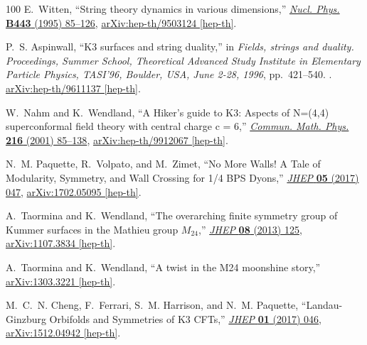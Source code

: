 \begin{thebibliography}{100}
E.~Witten, ``{String theory dynamics in various dimensions},''
  \href{http://dx.doi.org/10.1016/0550-3213(95)00158-O}{{\em Nucl. Phys.}
  {\bfseries B443} (1995) 85--126},
\href{http://arxiv.org/abs/hep-th/9503124}{{\ttfamily arXiv:hep-th/9503124
  [hep-th]}}.

P.~S. Aspinwall, ``{K3 surfaces and string duality},'' in {\em {Fields, strings
  and duality. Proceedings, Summer School, Theoretical Advanced Study Institute
  in Elementary Particle Physics, TASI'96, Boulder, USA, June 2-28, 1996}},
  pp.~421--540.
.
\newblock
\href{http://arxiv.org/abs/hep-th/9611137}{{\ttfamily arXiv:hep-th/9611137
  [hep-th]}}.
\newblock

W.~Nahm and K.~Wendland, ``{A Hiker's guide to K3: Aspects of N=(4,4)
  superconformal field theory with central charge c = 6},''
  \href{http://dx.doi.org/10.1007/PL00005548}{{\em Commun. Math. Phys.}
  {\bfseries 216} (2001) 85--138},
\href{http://arxiv.org/abs/hep-th/9912067}{{\ttfamily arXiv:hep-th/9912067
  [hep-th]}}.

N.~M. Paquette, R.~Volpato, and M.~Zimet, ``{No More Walls! A Tale of
  Modularity, Symmetry, and Wall Crossing for 1/4 BPS Dyons},''
  \href{http://dx.doi.org/10.1007/JHEP05(2017)047}{{\em JHEP} {\bfseries 05}
  (2017) 047},
\href{http://arxiv.org/abs/1702.05095}{{\ttfamily arXiv:1702.05095 [hep-th]}}.

A.~Taormina and K.~Wendland, ``{The overarching finite symmetry group of Kummer
  surfaces in the Mathieu group $M_{24}$},''
  \href{http://dx.doi.org/10.1007/JHEP08(2013)125}{{\em JHEP} {\bfseries 08}
  (2013) 125},
\href{http://arxiv.org/abs/1107.3834}{{\ttfamily arXiv:1107.3834 [hep-th]}}.

A.~Taormina and K.~Wendland, ``{A twist in the M24 moonshine story},''
\href{http://arxiv.org/abs/1303.3221}{{\ttfamily arXiv:1303.3221 [hep-th]}}.

M.~C.~N. Cheng, F.~Ferrari, S.~M. Harrison, and N.~M. Paquette,
  ``{Landau-Ginzburg Orbifolds and Symmetries of K3 CFTs},''
  \href{http://dx.doi.org/10.1007/JHEP01(2017)046}{{\em JHEP} {\bfseries 01}
  (2017) 046},
\href{http://arxiv.org/abs/1512.04942}{{\ttfamily arXiv:1512.04942 [hep-th]}}.


\end{thebibliography}
